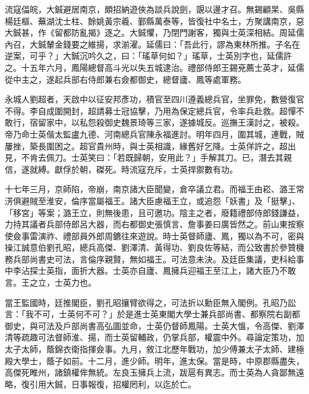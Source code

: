 \begin{pinyinscope}
流寇偪皖，大鋮避居南京，頗招納遊俠為談兵說劍，覬以邊才召。無錫顧杲、吳縣楊廷樞、蕪湖沈士柱、餘姚黃宗羲、鄞縣萬泰等，皆復社中名士，方聚講南京，惡大鋮甚，作《留都防亂揭》逐之。大鋮懼，乃閉門謝客，獨與士英深相結。周延儒內召，大鋮輦金錢要之維揚，求湔濯。延儒曰：「吾此行，謬為東林所推。子名在逆案，可乎？」大鋮沉吟久之，曰：「瑤草何如？」瑤草，士英別字也，延儒許之。十五年六月，鳳陽總督高斗光以失五城逮治。禮部侍郎王錫兗薦士英才，延儒從中主之，遂起兵部右侍郎兼右僉都御史，總督廬、鳳等處軍務。

永城人劉超者，天啟中以征安邦彥功，積官至四川遵義總兵官，坐罪免，數營復官不得。李自成圍開封，超請募士冠協擊，乃用為保定總兵官，令率兵赴救。超憚不敢行，宿留家中，以私怨殺御史魏景琦等三家，遂據城反。巡撫王漢討之，被殺。帝乃命士英偕太監盧九德、河南總兵官陳永福進討。明年四月，圍其城，連戰，賊屢挫，築長圍困之。超官貴州時，與士英相識，緣舊好乞降。士英佯許之，超出見，不肯去佩刀。士英笑曰：「若既歸朝，安用此？」手解其刀。已，潛去其親信，遂就縛。獻俘於朝，磔死。時流寇充斥，士英捍禦數有功。

十七年三月，京師陷，帝崩，南京諸大臣聞變，倉卒議立君。而福王由崧、潞王常淓俱避賊至淮安，倫序當屬福王。諸大臣慮福王立，或追怨「妖書」及「挺擊」、「移宮」等案；潞王立，則無後患，且可邀功。陰主之者，廢籍禮部侍郎錢謙益，力持其議者兵部侍郎呂大器，而右都御史張慎言、詹事姜曰廣皆然之。前山東按察使僉事雷演祚、禮部員外郎周鑣往來遊說。時士英督師廬、鳳，獨以為不可，密與操江誠意伯劉孔昭，總兵高傑、劉澤清、黃得功、劉良佐等結，而公致書於參贊機務兵部尚書史可法，言倫序親賢，無如福王。可法意未決。及廷臣集議，吏科給事中李沾探士英指，面折大器。士英亦自廬、鳳擁兵迎福王至江上，諸大臣乃不敢言。王之立，士英力也。

當王監國時，廷推閣臣，劉孔昭攘臂欲得之，可法折以勳臣無入閣例。孔昭乃訟言：「我不可，士英何不可？」於是進士英東閣大學士兼兵部尚書、都察院右副都御史，與可法及戶部尚書高弘圖並命，士英仍督師鳳陽。士英大慍，令高傑、劉澤清等疏趣可法督師淮、揚，而士英留輔政，仍掌兵部，權震中外。尋論定策功，加太子太師，蔭錦衣衛指揮僉事。九月，敘江北歷年戰功，加少傅兼太子太師、建極殿大學士，蔭子如前。十二月，進少師。明年，進太保。當是時，中原郡縣盡失，高傑死睢州，諸鎮權侔無統。左良玉擁兵上流，跋扈有異志。而士英為人貪鄙無遠略，復引用大鋮，日事報復，招權罔利，以迄於亡。


\end{pinyinscope}
